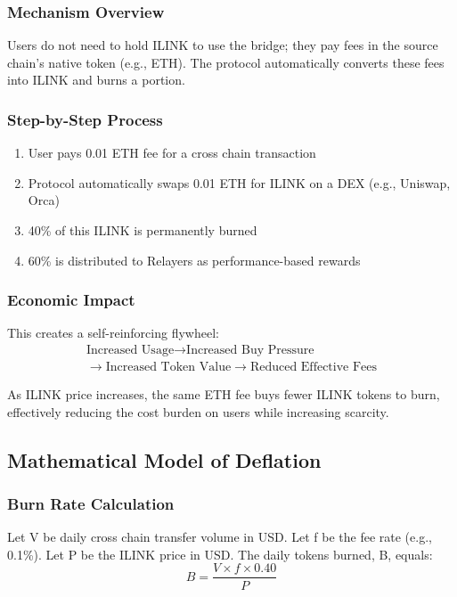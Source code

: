 \documentclass[11pt,a4paper]{article}
\begin{document}
\subsubsection{Mechanism Overview}
Users do not need to hold ILINK to use the bridge; they pay fees in the source chain's native token (e.g., ETH). The protocol automatically converts these fees into ILINK and burns a portion.

\subsubsection{Step-by-Step Process}
\begin{enumerate}
    \item User pays 0.01 ETH fee for a cross chain transaction
    \item Protocol automatically swaps 0.01 ETH for ILINK on a DEX (e.g., Uniswap, Orca)
    \item 40\% of this ILINK is permanently burned
    \item 60\% is distributed to Relayers as performance-based rewards
\end{enumerate}

\subsubsection{Economic Impact}
This creates a self-reinforcing flywheel:
\begin{equation*}
\begin{gathered}
    \text{Increased Usage} \rightarrow \text{Increased Buy Pressure} \\
    \rightarrow \text{Increased Token Value} \rightarrow \text{Reduced Effective Fees}
\end{gathered}
\end{equation*}

As ILINK price increases, the same ETH fee buys fewer ILINK tokens to burn, effectively reducing the cost burden on users while increasing scarcity.

\subsection{Mathematical Model of Deflation}

\subsubsection{Burn Rate Calculation}
Let V be daily cross chain transfer volume in USD.
Let f be the fee rate (e.g., 0.1\%).
Let P be the ILINK price in USD.
The daily tokens burned, B, equals:
$$ B = \frac{V \times f \times 0.40}{P} $$
\end{document}
